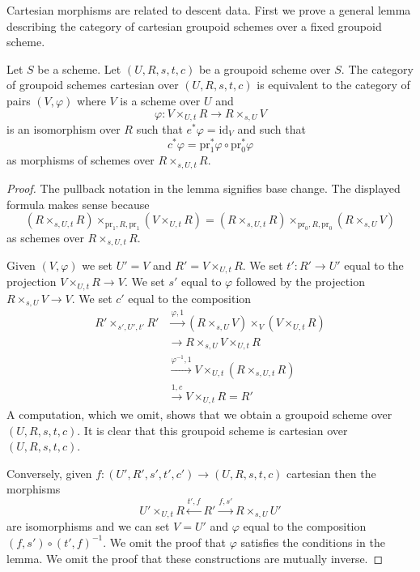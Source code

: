 \noindent
Cartesian morphisms are related to descent data. First we prove a general
lemma describing the category of cartesian groupoid schemes over a
fixed groupoid scheme.

\begin{lemma}
\label{lemma-characterize-cartesian-schemes}
Let $S$ be a scheme. Let $(U, R, s, t, c)$ be a groupoid scheme over $S$.
The category of groupoid schemes cartesian over $(U, R, s, t, c)$
is equivalent to the category of pairs $(V, \varphi)$ where $V$ is a
scheme over $U$ and
$$
\varphi :
V \times_{U, t} R
\longrightarrow
R \times_{s, U} V
$$
is an isomorphism over $R$ such that $e^*\varphi = \text{id}_V$ and such that
$$
c^*\varphi = \text{pr}_1^*\varphi \circ \text{pr}_0^*\varphi
$$
as morphisms of schemes over $R \times_{s, U, t} R$.
\end{lemma}

\begin{proof}
The pullback notation in the lemma signifies base change. The displayed
formula makes sense because
$$
(R \times_{s, U, t} R) \times_{\text{pr}_1, R, \text{pr}_1} (V \times_{U, t} R)
=
(R \times_{s, U, t} R) \times_{\text{pr}_0, R, \text{pr}_0} (R \times_{s, U} V)
$$
as schemes over $R \times_{s, U, t} R$.

\medskip\noindent
Given $(V, \varphi)$ we set $U' = V$ and $R' = V \times_{U, t} R$.
We set $t' : R' \to U'$ equal to the projection $V \times_{U, t} R \to V$.
We set $s'$ equal to $\varphi$ followed by the projection
$R \times_{s, U} V \to V$. We set $c'$ equal to the composition
\begin{align*}
R' \times_{s', U', t'} R'
& \xrightarrow{\varphi, 1}
(R \times_{s, U} V) \times_V (V \times_{U, t} R) \\
& \xrightarrow{}
R \times_{s, U} V \times_{U, t} R \\
& \xrightarrow{\varphi^{-1}, 1}
V \times_{U, t} (R \times_{s, U, t} R) \\
& \xrightarrow{1, c}
V \times_{U, t} R = R'
\end{align*}
A computation, which we omit, shows that we obtain a groupoid scheme
over $(U, R, s, t, c)$. It is clear that this groupoid scheme is
cartesian over $(U, R, s, t, c)$.

\medskip\noindent
Conversely, given $f : (U', R', s', t', c') \to (U, R, s, t, c)$
cartesian then the morphisms
$$
U' \times_{U, t} R \xleftarrow{t', f} R' \xrightarrow{f, s'} R \times_{s, U} U'
$$
are isomorphisms and we can set $V = U'$ and $\varphi$ equal to the
composition $(f, s') \circ (t', f)^{-1}$. We omit the proof that
$\varphi$ satisfies the conditions in the lemma. We omit the proof that
these constructions are mutually inverse.
\end{proof}


